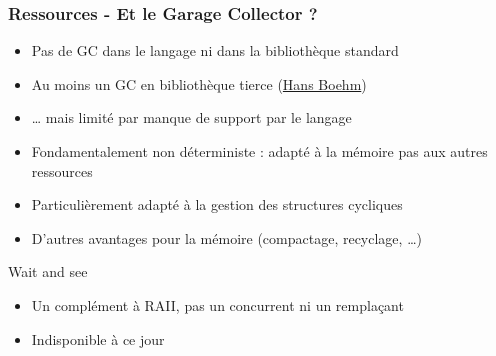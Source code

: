 \documentclass[C++.tex]{subfiles}
\begin{document}
\begin{frame}
	\frametitle{Ressources - Et le Garage Collector ?}
	\begin{itemize}
		\item Pas de GC dans le langage ni dans la bibliothèque standard
		\item Au moins un GC en bibliothèque tierce (\href{http://www.hboehm.info/gc/}{Hans Boehm})
		\item \ldots{} mais limité par manque de support par le langage
		\item Fondamentalement non déterministe : adapté à la mémoire pas aux autres ressources


		\item Particulièrement adapté à la gestion des structures cycliques


		\item D'autres avantages pour la mémoire (compactage, recyclage, \ldots)

	\end{itemize}

	\begin{block}{Wait and see}
		\begin{itemize}
			\item Un complément à RAII, pas un concurrent ni un remplaçant
			\item Indisponible à ce jour
		\end{itemize}


	\end{block}
\end{frame}
\end{document}
